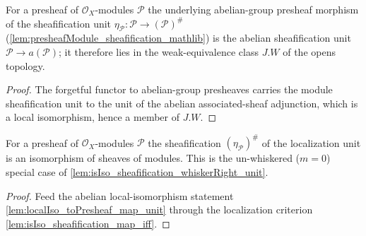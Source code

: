 \begin{lemma}
  \label{lem:localIso_toPresheaf_map_unit}
  For a presheaf of \(\mathcal{O}_X\)-modules \(\mathcal{P}\) the underlying
  abelian-group presheaf morphism of the sheafification unit
  \(\eta_{\mathcal{P}} : \mathcal{P} \to (\mathcal{P})^{\#}\)
  (\cref{lem:presheafModule_sheafification_mathlib}) is the abelian sheafification
  unit \(\mathcal{P} \to a(\mathcal{P})\); it therefore lies in the weak-equivalence
  class \(J.W\) of the opens topology.
\end{lemma}

\begin{proof}
  \leanok
  The forgetful functor to abelian-group presheaves carries the module
  sheafification unit to the unit of the abelian associated-sheaf adjunction, which
  is a local isomorphism, hence a member of \(J.W\).
\end{proof}

\begin{lemma}
  \label{lem:isIso_sheafification_map_unit}
  For a presheaf of \(\mathcal{O}_X\)-modules \(\mathcal{P}\) the sheafification
  \((\eta_{\mathcal{P}})^{\#}\) of the localization unit is an isomorphism of sheaves
  of modules. This is the un-whiskered (\(m = 0\)) special case of
  \cref{lem:isIso_sheafification_whiskerRight_unit}.
\end{lemma}

\begin{proof}
  \leanok
  Feed the abelian local-isomorphism statement
  \cref{lem:localIso_toPresheaf_map_unit} through the localization criterion
  \cref{lem:isIso_sheafification_map_iff}.
\end{proof}

